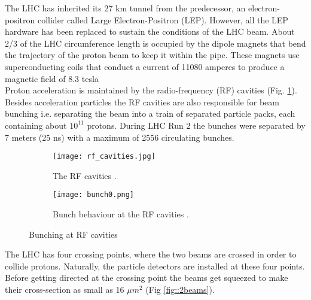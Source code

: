      The LHC has inherited its 27 km tunnel from the predecessor, an electron-positron collider called Large Electron-Positron (LEP). However, all the LEP hardware has been replaced to sustain the conditions of the LHC beam. About 2/3 of the LHC circumference length is occupied by the dipole magnets that bend the trajectory of the proton beam to keep it within the pipe. These magnets use superconducting coils that conduct a current of 11080 amperes to produce a magnetic field of 8.3 tesla \\
     Proton acceleration is maintained by the radio-frequency (RF) cavities (Fig. \ref{fig::rf_cavities}). Besides acceleration particles the RF cavities are also responsible for beam bunching i.e. separating the beam into a train of separated particle packs, each containing about $10^{11}$ protons. During LHC Run 2 the bunches were separated by 7 meters (25 ns) with a maximum of 2556 circulating bunches.
	\begin{figure}[htbp]
	\begin{subfigure}[t]{0.48\textwidth}
		\texttt{[image: rf\_cavities.jpg]}
		\caption[RF Cavities]{The RF cavities \cite{rf_cavities}.}
		\label{fig::rf_cavities}
	\end{subfigure}
	\hfill
	\begin{subfigure}[t]{0.48\textwidth}
		\texttt{[image: bunch0.png]}
		\caption[Beam pipes]{Bunch behaviour at the RF cavities \cite{Wilson:513326}.}
		\label{fig::bunching}
	\end{subfigure}
	\caption{Bunching at RF cavities}
	\label{fig::bunch_at_rf}
\end{figure}
	The LHC has four crossing points, where the two beams are crossed in order to collide protons. Naturally, the particle detectors are installed at these four points. Before getting directed at the crossing point the beams get squeezed to make their cross-section as small as 16 $\mu m^2$ (Fig \ref{fig::2beams}).  	

